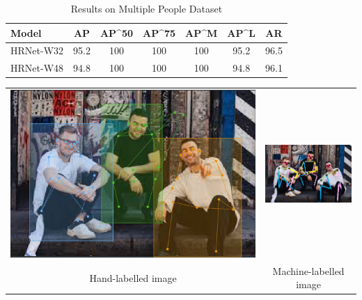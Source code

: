 \documentclass[a4paper,12pt]{article}
\begin{document}
\begin{table}[h]
    \begin{center}
    \begin{tabular}{ l | c | c | c | c | c | c}
    Model & AP & AP^{50} & AP^{75} & AP^{M} & AP^{L} & AR \\
    \hline \hline
    HRNet-W32 & 95.2 & 100 & 100 & 100 & 95.2 & 96.5 \\
    HRNet-W48 & 94.8 & 100 & 100 & 100 & 94.8 & 96.1 \\
    \end{tabular}
    \caption{Results on Multiple People Dataset}
    \label{tab:caption}
    \end{center}
\end{table}

\begin{center}
\begin{tabular}{cc}
\includegraphics[scale=0.2]{Multiple_people_3.png}
&
\includegraphics[scale=0.95]{multiple_people_image_code_labelled.png}
\\
Hand-labelled image & Machine-labelled image
\end{tabular}
\end{center}
\end{document}
